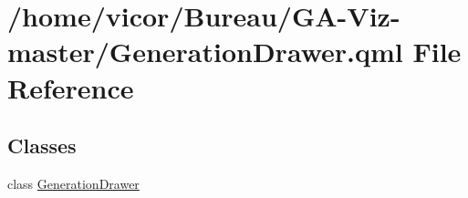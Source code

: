 \hypertarget{_generation_drawer_8qml}{}\section{/home/vicor/\+Bureau/\+G\+A-\/\+Viz-\/master/\+Generation\+Drawer.qml File Reference}
\label{_generation_drawer_8qml}
\subsection*{Classes}
\begin{DoxyCompactItemize}
\item 
class \hyperlink{class_generation_drawer}{Generation\+Drawer}
\end{DoxyCompactItemize}
